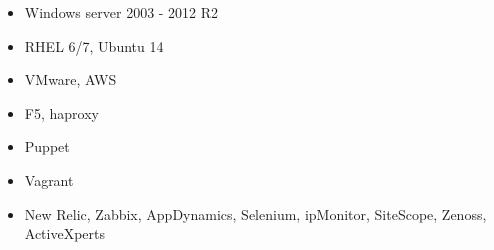 \begin{multicols}{2}
	\begin{itemize}
		\item Windows server 2003 - 2012 R2
		\item RHEL 6/7, Ubuntu 14
		\item VMware, AWS
		\item F5, haproxy
		\item Puppet
		\item Vagrant
		\item New Relic, Zabbix, AppDynamics, Selenium, ipMonitor, SiteScope, Zenoss, ActiveXperts
	\end{itemize}
	\vspace*{\fill}
\end{multicols}